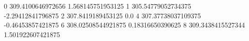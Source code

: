 0 309.4100646972656 1.568145751953125
1 305.54779052734375 -2.29412841796875
2 307.8419189453125 0.0
4 307.37738037109375 -0.46453857421875
6 308.02508544921875 0.18316650390625
8 309.3438415527344 1.501922607421875
